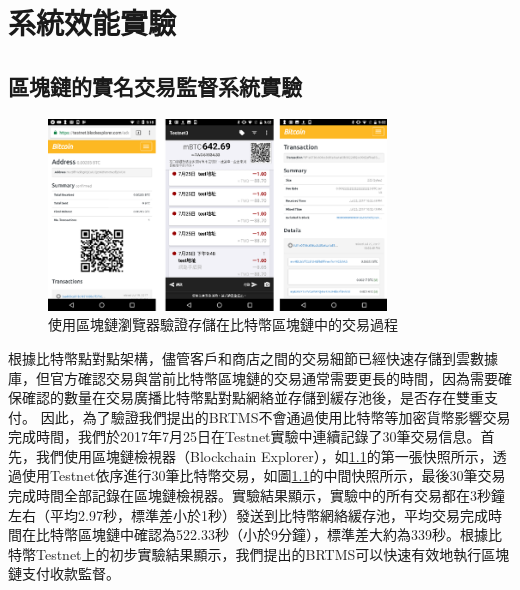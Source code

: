 
\chapter{系統效能實驗}
	\section{區塊鏈的實名交易監督系統實驗}

		\begin{figure}[htbp]
			\centering
			\includegraphics[width = 0.8\textwidth]{fig9.png}
			\caption{使用區塊鏈瀏覽器驗證存儲在比特幣區塊鏈中的交易過程}\label{fig9}
		\end{figure}

		根據比特幣點對點架構，儘管客戶和商店之間的交易細節已經快速存儲到雲數據庫，但官方確認交易與當前比特幣區塊鏈的交易通常需要更長的時間，因為需要確保確認的數量在交易廣播比特幣點對點網絡並存儲到緩存池後，是否存在雙重支付。
		因此，為了驗證我們提出的BRTMS不會通過使用比特幣等加密貨幣影響交易完成時間，我們於2017年7月25日在Testnet實驗中連續記錄了30筆交易信息。首先，我們使用區塊鏈檢視器（Blockchain Explorer）\supercite{Blockchainexplorer:Ananalyticalprocessandinvestigationenvironmentforbitcoin}，如\ref{fig9}的第一張快照所示，透過使用Testnet依序進行30筆比特幣交易，如圖\ref{fig9}的中間快照所示，最後30筆交易完成時間全部記錄在區塊鏈檢視器。實驗結果顯示，實驗中的所有交易都在3秒鐘左右（平均2.97秒，標準差小於1秒）發送到比特幣網絡緩存池，平均交易完成時間在比特幣區塊鏈中確認為522.33秒（小於9分鐘），標準差大約為339秒。根據比特幣Testnet上的初步實驗結果顯示，我們提出的BRTMS可以快速有效地執行區塊鏈支付收款監督。

